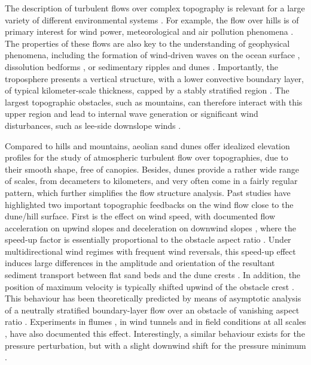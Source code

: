 The description of turbulent flows over complex topography is relevant for a large variety of different environmental systems \citep{Sherman1978, Walmsley1982, baines1995, Wood2000, Venditti2013, Finnigan2020}. For example, the flow over hills is of primary interest for wind power, meteorological and air pollution phenomena \citep{Taylor1987}. The properties of these flows are also key to the understanding of geophysical phenomena, including the formation of wind-driven waves on the ocean surface \citep{Sullivan2010}, dissolution bedforms \citep{Claudin2017, Guerin2020}, or sedimentary ripples and dunes \citep{Bagnold1941, Charru2013, Courrech2015}. Importantly, the troposphere presents a vertical structure, with a lower convective boundary layer, of typical kilometer-scale thickness, capped by a stably stratified region \citep{Stull1988}. The largest topographic obstacles, such as mountains, can therefore interact with this upper region and lead to internal wave generation or significant wind disturbances, such as lee-side downslope winds \citep{Durran1990}.

Compared to hills and mountains, aeolian sand dunes offer idealized elevation profiles for the study of atmospheric turbulent flow over topographies, due to their smooth shape, free of canopies. Besides, dunes provide a rather wide range of scales, from decameters to kilometers, and very often come in a fairly regular pattern, which further simplifies the flow structure analysis. Past studies have highlighted two important topographic feedbacks on the wind flow close to the dune/hill surface.
%
First is the effect on wind speed, with documented flow acceleration on upwind slopes \citep{Weaver2011} and deceleration on downwind slopes \citep{Baddock2007}, where the speed-up factor is essentially proportional to the obstacle aspect ratio \citep{Jackson1975}. Under multidirectional wind regimes with frequent wind reversals, this speed-up effect induces large differences in the amplitude and orientation of the resultant sediment transport between flat sand beds and the dune crests \citep{Zhang2014, Rozier2019, Gao2021}. In addition, the position of maximum velocity is typically shifted upwind of the obstacle crest \citep{Jackson1975, Claudin2013}. This behaviour has been theoretically predicted by means of asymptotic analysis of a neutrally stratified boundary-layer flow over an obstacle of vanishing aspect ratio \citep{Jackson1975, Mason1979, Sykes1980, Hunt1988, Belcher1998, Kroy2002}. Experiments in flumes \citep{Zilker1977, Zilker1979, Frederick1988, Poggi2007, Bristow2022}, in wind tunnels \citep{Gong1989, Finnigan1990, Gong1996} and in field conditions at all scales \citep{Taylor1987a, Claudin2013, Fernando2019, Lu2021}, have also documented this effect. Interestingly, a similar behaviour exists for the pressure perturbation, but with a slight downwind shift for the pressure minimum \citep{Claudin2021}.

